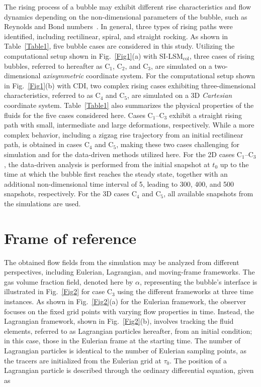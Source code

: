 \documentclass[a4paper,fleqn]{cas-sc}
\begin{document}
	The rising process of a bubble may exhibit different rise characteristics and flow dynamics depending on the non-dimensional parameters of the bubble, such as Reynolds and Bond numbers~\cite{Cano-Lozano2016, Hua2007}. In general, three types of rising paths were identified, including rectilinear, spiral, and straight rocking. As shown in Table~\ref{Table1}, five bubble cases are considered in this study. Utilizing the computational setup shown in Fig.~\ref{Fig1}(a) with SI-LSM$_{\text{col}}$, three cases of rising bubbles, referred to hereafter as C$_1$, C$_2$, and C$_3$, are simulated on a two-dimensional \textit{axisymmetric} coordinate system. For the computational setup shown in Fig.~\ref{Fig1}(b) with CDI, two complex rising cases exhibiting three-dimensional characteristics, referred to as C$_4$ and C$_5$, are simulated on a 3D \textit{Cartesian} coordinate system. Table~\ref{Table1} also summarizes the physical properties of the fluids for the five cases considered here. Cases C$_1$--C$_3$ exhibit a straight rising path with small, intermediate and large deformations, respectively. While a more complex behavior, including a zigzag rise trajectory from an initial rectilinear path, is obtained in cases C$_4$ and C$_5$, making these two cases challenging for simulation and for the data-driven methods utilized here. For the 2D cases C$_1$--C$_3$, the data-driven analysis is performed from the initial snapshot at $t_0$ up to the time at which the bubble first reaches the steady state, together with an additional non-dimensional time interval of 5, leading to 300, 400, and 500 snapshots, respectively. For the 3D cases C$_4$ and C$_5$, all available snapshots from the simulations are used.
	
	\section{Frame of reference}
	\label{Framework}
	
	The obtained flow fields from the simulation may be analyzed from different perspectives, including Eulerian, Lagrangian, and moving-frame frameworks. The gas volume fraction field, denoted here by $\alpha$, representing the bubble's interface is illustrated in Fig.~\ref{Fig2} for case C$_3$ using the different frameworks at three time instances. As shown in Fig.~\ref{Fig2}(a) for the Eulerian framework, the observer focuses on the fixed grid points with varying flow properties in time. Instead, the Lagrangian framework, shown in Fig.~\ref{Fig2}(b), involves tracking the fluid elements, referred to as Lagrangian particles hereafter, from an initial condition; in this case, those in the Eulerian frame at the starting time. The number of Lagrangian particles is identical to the number of Eulerian sampling points, as the tracers are initialized from the Eulerian grid at $\tau_0$. The position of a Lagrangian particle is described through the ordinary differential equation, given as
	
\end{document}
